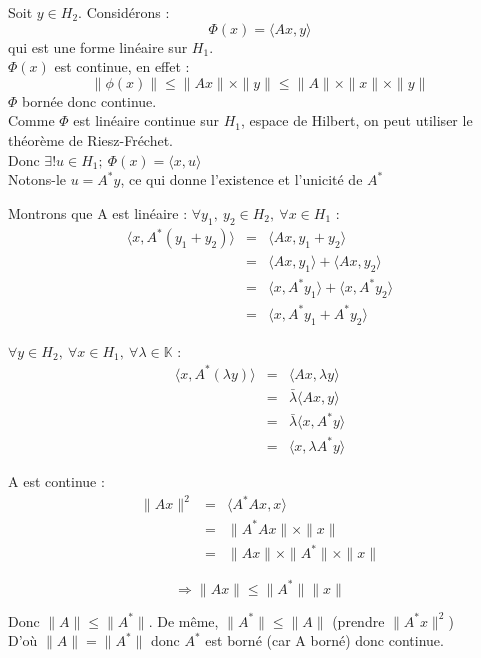 \begin{dem}
Soit $y\in H_2$. Considérons : 
\[\Phi(x)=\langle Ax,y\rangle\]
qui est une forme linéaire sur $H_1$.\\
$\Phi(x)$ est continue, en effet :
\[\|\phi(x)\|\leq \|Ax\|\times\|y\| \leq \|A\|\times\|x\|\times\|y\|\]
$\Phi$ bornée donc continue. \\
Comme $\Phi$ est linéaire continue sur $H_1$, espace de Hilbert, on peut utiliser le théorème de Riesz-Fréchet.\\
Donc $\exists!u\in H_1;\ \Phi(x)=\langle x,u\rangle$\\
Notons-le $u=A^*y$, ce qui donne l'existence et l'unicité de $A^*$

\bigskip
Montrons que A est linéaire :
$\forall y_1,\ y_2\in H_2,\ \forall x\in H_1$ :
\begin{eqnarray*}
	\langle x,A^*(y_1+y_2)\rangle&=&\langle Ax, y_1+y_2\rangle\\
				&=&\langle Ax,y_1\rangle + \langle Ax,y_2\rangle\\
				&=&\langle x,A^*y_1\rangle + \langle x,A^*y_2\rangle \\
				&=&\langle x, A^*y_1+A^*y_2\rangle
\end{eqnarray*}

$\forall y\in H_2,\ \forall x\in H_1,\ \forall \lambda\in\mathbb{K}$ :
\begin{eqnarray*}
	\langle x, A^*(\lambda y)\rangle &=& \langle Ax, \lambda y\rangle \\
					&=& \bar{\lambda} \langle Ax, y\rangle \\
					&=& \bar{\lambda} \langle x, A^*y\rangle \\
					&=& \langle x, \lambda A^*y\rangle
\end{eqnarray*}

\bigskip
A est continue :
\begin{eqnarray*}
	\|Ax\|^2 &=& \langle A^*Ax,x\rangle\\
		&=& \|A^*Ax\| \times \|x\|\\
		&=& \|Ax\|\times\|A^*\|\times\|x\|
\end{eqnarray*}

\[\Rightarrow \|Ax\|\leq \|A^*\|\|x\|\]

Donc $\|A\|\leq \|A^*\|$. De même, $\|A^*\|\leq \|A\|$ (prendre $\|A^*x\|^2$)\\
D'où $\|A\|=\|A^*\|$ donc $A^*$ est borné (car A borné) donc continue.
\end{dem}


